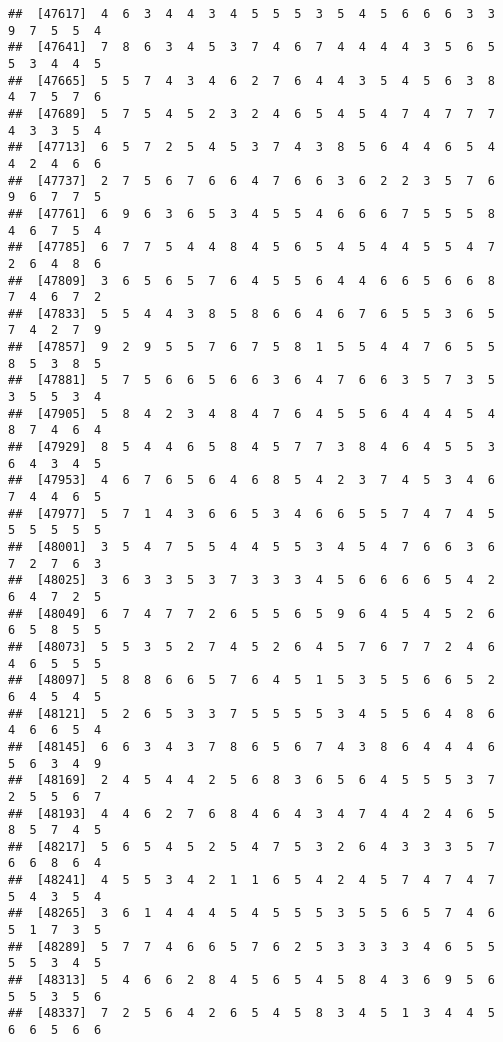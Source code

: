 \documentclass[
]{book}
\begin{document}
\begin{verbatim}
##  [47617]  4  6  3  4  4  3  4  5  5  5  3  5  4  5  6  6  6  3  3  9  7  5  5  4
##  [47641]  7  8  6  3  4  5  3  7  4  6  7  4  4  4  4  3  5  6  5  5  3  4  4  5
##  [47665]  5  5  7  4  3  4  6  2  7  6  4  4  3  5  4  5  6  3  8  4  7  5  7  6
##  [47689]  5  7  5  4  5  2  3  2  4  6  5  4  5  4  7  4  7  7  7  4  3  3  5  4
##  [47713]  6  5  7  2  5  4  5  3  7  4  3  8  5  6  4  4  6  5  4  4  2  4  6  6
##  [47737]  2  7  5  6  7  6  6  4  7  6  6  3  6  2  2  3  5  7  6  9  6  7  7  5
##  [47761]  6  9  6  3  6  5  3  4  5  5  4  6  6  6  7  5  5  5  8  4  6  7  5  4
##  [47785]  6  7  7  5  4  4  8  4  5  6  5  4  5  4  4  5  5  4  7  2  6  4  8  6
##  [47809]  3  6  5  6  5  7  6  4  5  5  6  4  4  6  6  5  6  6  8  7  4  6  7  2
##  [47833]  5  5  4  4  3  8  5  8  6  6  4  6  7  6  5  5  3  6  5  7  4  2  7  9
##  [47857]  9  2  9  5  5  7  6  7  5  8  1  5  5  4  4  7  6  5  5  8  5  3  8  5
##  [47881]  5  7  5  6  6  5  6  6  3  6  4  7  6  6  3  5  7  3  5  3  5  5  3  4
##  [47905]  5  8  4  2  3  4  8  4  7  6  4  5  5  6  4  4  4  5  4  8  7  4  6  4
##  [47929]  8  5  4  4  6  5  8  4  5  7  7  3  8  4  6  4  5  5  3  6  4  3  4  5
##  [47953]  4  6  7  6  5  6  4  6  8  5  4  2  3  7  4  5  3  4  6  7  4  4  6  5
##  [47977]  5  7  1  4  3  6  6  5  3  4  6  6  5  5  7  4  7  4  5  5  5  5  5  5
##  [48001]  3  5  4  7  5  5  4  4  5  5  3  4  5  4  7  6  6  3  6  7  2  7  6  3
##  [48025]  3  6  3  3  5  3  7  3  3  3  4  5  6  6  6  6  5  4  2  6  4  7  2  5
##  [48049]  6  7  4  7  7  2  6  5  5  6  5  9  6  4  5  4  5  2  6  6  5  8  5  5
##  [48073]  5  5  3  5  2  7  4  5  2  6  4  5  7  6  7  7  2  4  6  4  6  5  5  5
##  [48097]  5  8  8  6  6  5  7  6  4  5  1  5  3  5  5  6  6  5  2  6  4  5  4  5
##  [48121]  5  2  6  5  3  3  7  5  5  5  5  3  4  5  5  6  4  8  6  4  6  6  5  4
##  [48145]  6  6  3  4  3  7  8  6  5  6  7  4  3  8  6  4  4  4  6  5  6  3  4  9
##  [48169]  2  4  5  4  4  2  5  6  8  3  6  5  6  4  5  5  5  3  7  2  5  5  6  7
##  [48193]  4  4  6  2  7  6  8  4  6  4  3  4  7  4  4  2  4  6  5  8  5  7  4  5
##  [48217]  5  6  5  4  5  2  5  4  7  5  3  2  6  4  3  3  3  5  7  6  6  8  6  4
##  [48241]  4  5  5  3  4  2  1  1  6  5  4  2  4  5  7  4  7  4  7  5  4  3  5  4
##  [48265]  3  6  1  4  4  4  5  4  5  5  5  3  5  5  6  5  7  4  6  5  1  7  3  5
##  [48289]  5  7  7  4  6  6  5  7  6  2  5  3  3  3  3  4  6  5  5  5  5  3  4  5
##  [48313]  5  4  6  6  2  8  4  5  6  5  4  5  8  4  3  6  9  5  6  5  5  3  5  6
##  [48337]  7  2  5  6  4  2  6  5  4  5  8  3  4  5  1  3  4  4  5  6  6  5  6  6

\end{verbatim}
\end{document}
